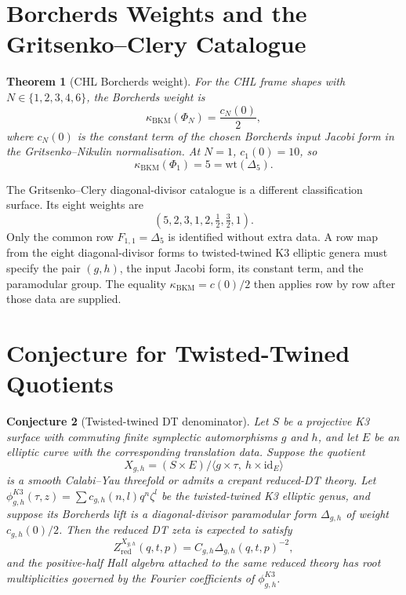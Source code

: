 \documentclass[11pt]{article}
\newtheorem{theorem}{Theorem}
\newtheorem{conjecture}[theorem]{Conjecture}
\theoremstyle{definition}
\providecommand{\kBKM}{\kappa_{\mathrm{BKM}}}
\begin{document}
\section{Borcherds Weights and the Gritsenko--Clery Catalogue}
\label{sec:weights}

\begin{theorem}[CHL Borcherds weight]
\label{thm:chl-weight}
For the CHL frame shapes with $N\in\{1,2,3,4,6\}$, the Borcherds
weight is
\[
 \kBKM(\Phi_N)=\frac{c_N(0)}{2},
\]
where $c_N(0)$ is the constant term of the chosen Borcherds input
Jacobi form in the Gritsenko--Nikulin normalisation. At $N=1$,
$c_1(0)=10$, so
\[
 \kBKM(\Phi_1)=5=\mathrm{wt}(\Delta_5).
\]
\end{theorem}

The Gritsenko--Clery diagonal-divisor catalogue is a different
classification surface. Its eight weights are
\[
 (5,2,3,1,2,\tfrac12,\tfrac32,1).
\]
Only the common row $F_{1,1}=\Delta_5$ is identified without extra
data. A row map from the eight diagonal-divisor forms to twisted-twined
K3 elliptic genera must specify the pair $(g,h)$, the input Jacobi
form, its constant term, and the paramodular group. The equality
$\kBKM=c(0)/2$ then applies row by row after those data are supplied.

\section{Conjecture for Twisted-Twined Quotients}
\label{sec:conjecture}

\begin{conjecture}[Twisted-twined DT denominator]
\label{conj:twisted-twined-dt}
Let $S$ be a projective K3 surface with commuting finite symplectic
automorphisms $g$ and $h$, and let $E$ be an elliptic curve with the
corresponding translation data. Suppose the quotient
\[
 X_{g,h}=(S\times E)/\langle g\times\tau,\ h\times\mathrm{id}_E\rangle
\]
is a smooth Calabi--Yau threefold or admits a crepant reduced-DT theory.
Let $\phi_{g,h}^{K3}(\tau,z)=\sum c_{g,h}(n,l)q^n\zeta^l$ be the
twisted-twined K3 elliptic genus, and suppose its Borcherds lift is a
diagonal-divisor paramodular form $\Delta_{g,h}$ of weight
$c_{g,h}(0)/2$. Then the reduced DT zeta is expected to satisfy
\[
 Z^{X_{g,h}}_{\mathrm{red}}(q,t,p)
 = C_{g,h}\Delta_{g,h}(q,t,p)^{-2},
\]
and the positive-half Hall algebra attached to the same reduced theory
has root multiplicities governed by the Fourier coefficients of
$\phi_{g,h}^{K3}$.
\end{conjecture}
\end{document}
